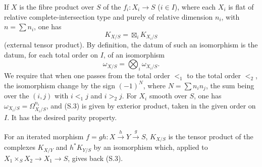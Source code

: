 \documentclass[11pt]{article}
\begin{document}
If $X$ is the fibre product over $S$ of the $f_i:X_i\to S$ ($i\in I$), where each $X_i$ is flat of relative complete-intersection type and purely of relative dimension $n_i$, with $n=\sum n_i$, one has
\begin{equation}
        K_{X/S}=\boxtimes_iK_{X_i/S} \tag{S.2}
\end{equation}
(external tensor product). By definition, the datum of such an isomorphism is the datum, for each total order on $I$, of an isomorphism
\begin{equation}
        \omega_{X/S}=\bigotimes_i\omega_{X_i/S}. \tag{S.3}
\end{equation}
We require that when one passes from the total order $<_1$ to the total order $<_2$, the isomorphism change by the sign $(-1)^N$, where $N=\sum n_in_j$, the sum being over the $(i,j)$ with $i<_1j$ and $i>_2j$. For $X_i$ smooth over $S$, one has $\omega_{X_i/S}=\Omega^{n_i}_{X_i/S}$, and (S.3) is given by exterior product, taken in the given order on $I$. It has the desired parity property.

For an iterated morphism $f=gh:X\xrightarrow{h}Y\xrightarrow{g}S$, $K_{X/S}$ is the tensor product of the complexes $K_{X/Y}$ and $h^*K_{Y/S}$ by an isomorphism which, applied to $X_1\times_SX_2\to X_1\to S$, gives back (S.3).
\end{document}
